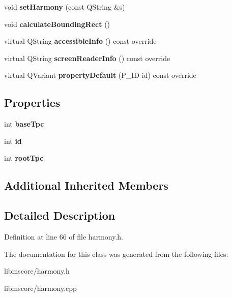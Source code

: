 \begin{DoxyCompactItemize}
\item 
\mbox{\label{class_ms_1_1_harmony_a295a696a8b750962250bf47b7f1acda5}} 
void {\bfseries set\+Harmony} (const Q\+String \&s)
\item 
\mbox{\label{class_ms_1_1_harmony_a3f97cf22c4eaa0bd14251fab1553a48e}} 
void {\bfseries calculate\+Bounding\+Rect} ()
\item 
\mbox{\label{class_ms_1_1_harmony_a457f3a9d665a660d85e9c2989832df61}} 
virtual Q\+String {\bfseries accessible\+Info} () const override
\item 
\mbox{\label{class_ms_1_1_harmony_ab12269daa685ce8ddfd371c88abeee89}} 
virtual Q\+String {\bfseries screen\+Reader\+Info} () const override
\item 
\mbox{\label{class_ms_1_1_harmony_a2b197d75a56ac548d7b898f6f880886c}} 
virtual Q\+Variant {\bfseries property\+Default} (P\+\_\+\+ID id) const override
\end{DoxyCompactItemize}
\subsection*{Properties}
\begin{DoxyCompactItemize}
\item 
\mbox{\label{class_ms_1_1_harmony_a82e1075ecd20fb5dd7f63901a8a6f702}} 
int {\bfseries base\+Tpc}
\item 
\mbox{\label{class_ms_1_1_harmony_acd2ea45cd206081ea329b0d5393c20e7}} 
int {\bfseries id}
\item 
\mbox{\label{class_ms_1_1_harmony_a95be4b35104af88081e0e16b610255e6}} 
int {\bfseries root\+Tpc}
\end{DoxyCompactItemize}
\subsection*{Additional Inherited Members}


\subsection{Detailed Description}


Definition at line 66 of file harmony.\+h.



The documentation for this class was generated from the following files\+:\begin{DoxyCompactItemize}
\item 
libmscore/harmony.\+h\item 
libmscore/harmony.\+cpp\end{DoxyCompactItemize}
